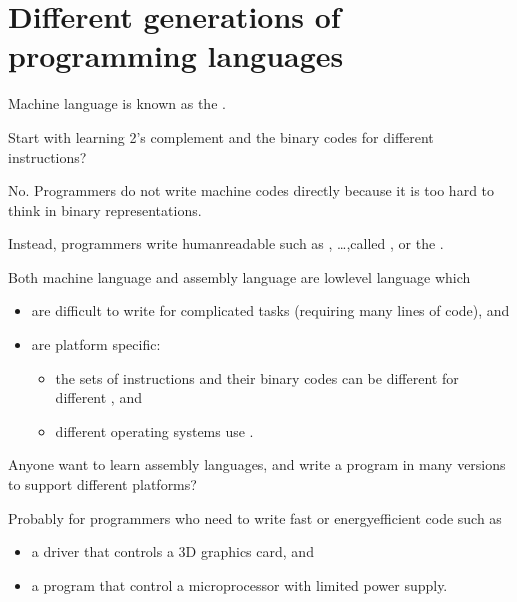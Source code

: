 \documentclass[letterpaper,10pt,english]{sphinxmanual}
\begin{document}
\section{Different generations of programming languages}
\label{\detokenize{Lecture1/Introduction to Computer Programming:different-generations-of-programming-languages}}
Machine language is known as the .

Start with learning 2’s complement and the binary codes for different instructions?

No. Programmers do not write machine codes directly because it is too hard to think in binary representations.

Instead, programmers write human\sphinxhyphen{}readable  such as , …,called , or the .




Both machine language and assembly language are low\sphinxhyphen{}level language which
\begin{itemize}
\item {} 
are difficult to write for complicated tasks (requiring many lines of code), and

\item {} 
are platform specific:
\begin{itemize}
\item {} 
the sets of instructions and their binary codes can be different for different , and

\item {} 
different operating systems use .

\end{itemize}

\end{itemize}

Anyone want to learn assembly languages, and write a program in many versions to support different platforms?

Probably for programmers who need to write fast or energy\sphinxhyphen{}efficient code such as
\begin{itemize}
\item {} 
a driver that controls a 3D graphics card, and

\item {} 
a program that control a microprocessor with limited power supply.

\end{itemize}
\end{document}
